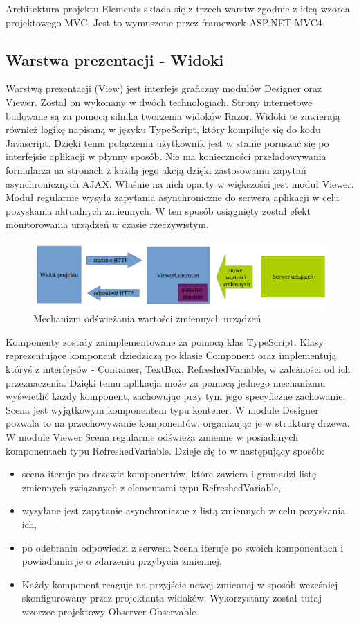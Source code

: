Architektura projektu Elements składa się z trzech warstw zgodnie z ideą wzorca projektowego MVC. Jest to wymuszone przez framework ASP.NET MVC4. 

\subsection{Warstwa prezentacji - Widoki}
Warstwą prezentacji (View) jest interfejs graficzny modułów Designer oraz Viewer. Został on wykonany w dwóch technologiach. Strony internetowe budowane są za pomocą silnika tworzenia widoków Razor. Widoki te zawierają również logikę napisaną w języku TypeScript, który kompiluje się do kodu Javascript. Dzięki temu połączeniu użytkownik jest w stanie poruszać się po interfejsie aplikacji w płynny sposób. Nie ma konieczności przeładowywania formularza na stronach z każdą jego akcją dzięki zastosowaniu zapytań asynchronicznych AJAX. Właśnie na nich oparty w większości jest moduł Viewer. Moduł regularnie wysyła zapytania asynchroniczne do serwera aplikacji w celu pozyskania aktualnych zmiennych. W ten sposób osiągnięty został efekt monitorowania urządzeń w czasie rzeczywistym.

\begin{figure}[h]
	\includegraphics[width=150mm]{./img/viewer.png}
	\caption{Mechanizm odświeżania wartości zmiennych urządzeń}
	\label{fig:viewer}
\end{figure}

Komponenty zostały zaimplementowane za pomocą klas TypeScript. Klasy reprezentujące komponent dziedziczą po klasie Component oraz implementują któryś z interfejsów - Container, TextBox, RefreshedVariable, w zależności od ich przeznaczenia. Dzięki temu aplikacja może za pomocą jednego mechanizmu wyświetlić każdy komponent, zachowując przy tym jego specyficzne zachowanie. Scena jest wyjątkowym komponentem typu kontener. W module Designer pozwala to na przechowywanie komponentów, organizując je w strukturę drzewa. W module Viewer Scena regularnie odświeża zmienne w posiadanych komponentach typu RefreshedVariable. Dzieje się to w następujący sposób:
\begin{itemize}
\item scena iteruje po drzewie komponentów, które zawiera i gromadzi listę zmiennych związanych z elementami typu RefreshedVariable,
\item wysyłane jest zapytanie asynchroniczne z listą zmiennych w celu pozyskania ich,
\item po odebraniu odpowiedzi z serwera Scena iteruje po swoich komponentach i powiadamia je o zdarzeniu przybycia zmiennej,
\item Każdy komponent reaguje na przyjście nowej zmiennej w sposób wcześniej skonfigurowany przez projektanta widoków. Wykorzystany został tutaj wzorzec projektowy Observer-Observable.
\end{itemize}

